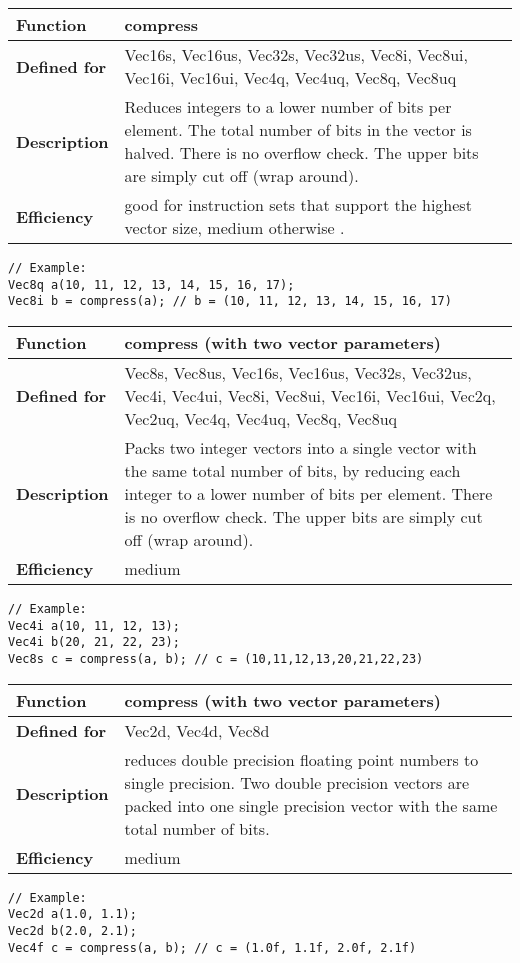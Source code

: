 \documentclass[vcl_manual.tex]{subfiles}
\begin{document}
\begin{tabular}{|p{30mm}|p{120mm}|}
\hline
\bfseries Function & compress \\ \hline
\bfseries Defined for & Vec16s, Vec16us, Vec32s, Vec32us, 
Vec8i, Vec8ui, Vec16i, Vec16ui,  
Vec4q, Vec4uq, Vec8q, Vec8uq \\ \hline
\bfseries Description & Reduces integers to a lower number of bits per element. 
The total number of bits in the vector is halved. 
There is no overflow check. The upper bits are simply cut off (wrap around). \\ \hline
\bfseries Efficiency & good for instruction sets that support the highest vector size, medium otherwise . \\ \hline
\end{tabular}
\begin{lstlisting}[frame=none]
// Example:
Vec8q a(10, 11, 12, 13, 14, 15, 16, 17);
Vec8i b = compress(a); // b = (10, 11, 12, 13, 14, 15, 16, 17)
\end{lstlisting}


\begin{tabular}{|p{30mm}|p{120mm}|}
\hline
\bfseries Function & compress (with two vector parameters) \\ \hline
\bfseries Defined for & Vec8s, Vec8us, Vec16s, Vec16us, Vec32s, Vec32us, 
Vec4i, Vec4ui, Vec8i, Vec8ui, Vec16i, Vec16ui,  
Vec2q, Vec2uq, Vec4q, Vec4uq, Vec8q, Vec8uq \\ \hline
\bfseries Description & Packs two integer vectors into a single vector with the same total number of bits, by reducing each integer to a lower number of bits per element. 
There is no overflow check. The upper bits are simply cut off (wrap around). \\ \hline
\bfseries Efficiency & medium \\ \hline
\end{tabular}
\begin{lstlisting}[frame=none]
// Example:
Vec4i a(10, 11, 12, 13);
Vec4i b(20, 21, 22, 23);
Vec8s c = compress(a, b); // c = (10,11,12,13,20,21,22,23)
\end{lstlisting}


\begin{tabular}{|p{30mm}|p{120mm}|}
\hline
\bfseries Function & compress (with two vector parameters)\\ \hline
\bfseries Defined for & Vec2d, Vec4d, Vec8d \\ \hline
\bfseries Description & reduces double precision floating point numbers to single precision. Two double precision vectors are packed into one single precision vector with the same total number of bits. \\ \hline
\bfseries Efficiency & medium \\ \hline
\end{tabular}
\begin{lstlisting}[frame=none]
// Example:
Vec2d a(1.0, 1.1);
Vec2d b(2.0, 2.1);
Vec4f c = compress(a, b); // c = (1.0f, 1.1f, 2.0f, 2.1f)
\end{lstlisting}
\end{document}
